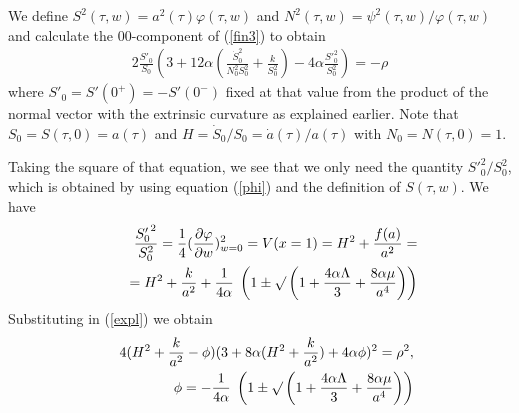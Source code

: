 \documentclass[a4paper,a4paper]{article}
\begin{document}
We define $S^2(\tau,w)=a^2(\tau) \varphi (\tau,w)$
and $N^2(\tau,w)= \psi^2(\tau,w)/  \varphi (\tau ,w)$ and calculate the 00-component of 
(\ref{fin3}) to obtain
\begin{eqnarray} \label{expl}
2\frac{S'_0}{S_0} \left( 3 +12 \alpha \left( \frac{\dot S_0^2}{N_0^2 S_0^2}+\frac{k}{S_0^2} \right)
-4 \alpha \frac{{S'}^2_0}{S_0^2} \right)=  -\rho
\end{eqnarray}
where $S'_0=S'(0^+)=-S'(0^-)$ fixed at that value from the product of the normal vector with the
extrinsic curvature as explained earlier. Note that $S_0=S(\tau,0)=a(\tau)$ and 
$H=\dot S_0/ S_0= \dot a(\tau)/a(\tau)$
with $N_0=N(\tau,0)=1$.


Taking the square of that equation, we see that we only need the quantity ${S'}^2_0/S_0^2$, which is obtained
by using equation (\ref{phi}) and the definition of $S(\tau,w)$. We have
\begin{eqnarray} \label{basicdis}
&&\frac{{S'_0}^2}{S_0^2}=\frac{1}{4} ( \frac{\partial \varphi} { \partial w} )_{w=0}^2=V(x=1)=
 H^2+ \frac{f(a)}{a^2} = \\
&& \quad =H^2+ \frac{k}{a^2} + \frac{1}{4 \alpha} \;  
\left( 1 \pm \surd \left(1+\frac{4 \alpha \Lambda}{3} +\frac{8 \alpha \mu}{ a^4 } \right) \right) \nonumber
\end{eqnarray}
Substituting in (\ref{expl}) we obtain
 \begin{eqnarray} \label{h}
&&4 (H^2+\frac{k}{a^2}- {\phi}) (3+ 8 \alpha  
(H^2+\frac{k}{a^2}) + 4 \alpha {\phi})^2 = {\rho}^2, \\
&& \phi= - \frac{1}{4 \alpha} \;  
\left( 1 \pm \surd \left(1+\frac{4 \alpha \Lambda}{3}
+\frac{8 \alpha \mu}{ a^4 } \right) \right) \nonumber
\end{eqnarray}
\end{document}
